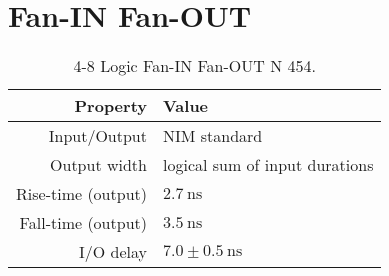 \section{Fan-IN Fan-OUT} \label{app:FAN IN - FAN OUT}
\begin{table}[!htp]
	\centering
	\begin{tabular}{rl}
		\toprule
		Property	  & Value 	 \\
		\midrule
		Input/Output & NIM standard\\
		Output width & logical sum of input durations\\
		Rise-time (output)	& $\SI{2.7}{\nano\second}$\\
		Fall-time (output)	& $\SI{3.5}{\nano\second}$\\
		I/O delay	&	$7.0\pm\SI{0.5}{\nano\second}$\\
		\bottomrule		
	\end{tabular}
	\caption{4-8 Logic Fan-IN Fan-OUT N 454.}
\end{table}



